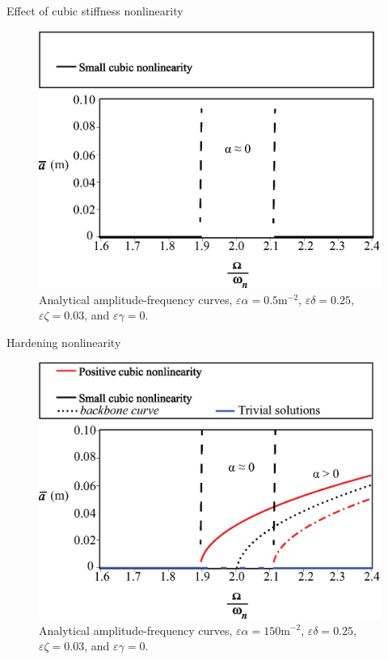 \documentclass[LaTeX2e,10pt]{beamer}
\begin{document}
\begin{frame}{Effect of cubic stiffness nonlinearity}
\begin{figure}[h!]
		\centering
		\includegraphics[width=0.9\linewidth]{Images/4/AmplitudeFrequencyNonlinear1-0.eps}
		\caption{Analytical amplitude-frequency curves, \textcolor[rgb]{0,0,0}{$\varepsilon \alpha = 0.5 \mathrm{m^{-2}}$}, $\varepsilon \delta = 0.25$, $\varepsilon \zeta = 0.03$, and $\varepsilon \gamma = 0$.}
	\end{figure}
\end{frame}
\begin{frame}{Hardening nonlinearity}
	\begin{figure}[h!]
		\centering
		\includegraphics[width=0.9\linewidth]{Images/4/AmplitudeFrequencyNonlinear1-2.eps}
		\caption{Analytical amplitude-frequency curves, \colorbox[rgb]{1,0.28,0.28}{$\varepsilon \alpha = 150 \mathrm{m^{-2}}$}, $\varepsilon \delta = 0.25$, $\varepsilon \zeta = 0.03$, and $\varepsilon \gamma = 0$.}
	\end{figure}
\end{frame}
\end{document}
